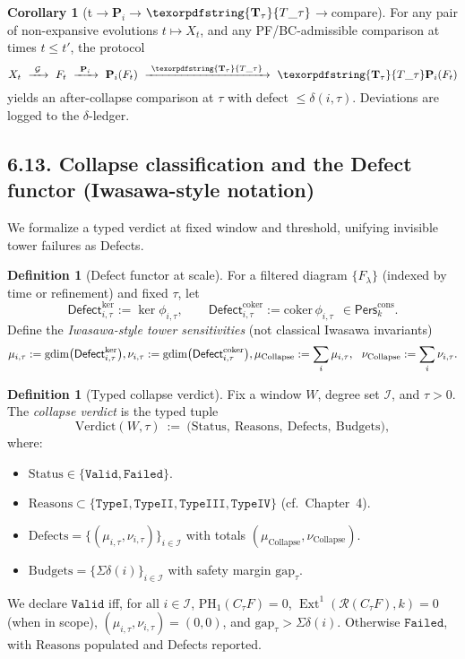 \documentclass[11pt]{article}
\numberwithin{equation}{section}
\theoremstyle{plain}
\theoremstyle{definition}
\theoremstyle{remark}
\DeclareMathOperator{\Ext}{Ext}
\DeclareRobustCommand{\hyp}{\nobreakdash-}
\newcommand{\Pers}{\mathsf{Pers}}
\newcommand{\Rfun}{\mathcal{R}}
\theoremstyle{plain}
\theoremstyle{definition}
\numberwithin{equation}{section}
\newtheorem{corollary}[theorem]{Corollary}
\theoremstyle{definition}
\newtheorem{definition}[theorem]{Definition}
\DeclareRobustCommand{\Perskft}{\Pers^{\mathrm{cons}}_{k}}
\DeclareRobustCommand{\Ttau}{\texorpdfstring{\ensuremath{\mathbf{T}_{\tau}}}{T\_\tau}}
\DeclareRobustCommand{\muc}{\mu_{\mathrm{Collapse}}}
\DeclareRobustCommand{\nuc}{\nu_{\mathrm{Collapse}}}
\numberwithin{equation}{section}
\theoremstyle{plain}
\theoremstyle{definition}
\theoremstyle{remark}
\providecommand{\Tfun}[1]{\mathbf{T}_{#1}}
\providecommand{\Ttau}{\Tfun{\tau}}
\DeclareMathOperator{\coker}{coker} %
\providecommand{\Defect}{\mathsf{Defect}}
\providecommand{\muc}{\mu_{\mathrm{Collapse}}}
\providecommand{\nuc}{\nu_{\mathrm{Collapse}}}
\providecommand{\n}{\unskip\space}
\begin{document}
\begin{corollary}[t\texorpdfstring{$\to$}{->}\(\mathbf{P}_i\)\texorpdfstring{$\to$}{->}\(\Ttau\)\texorpdfstring{$\to$}{->}compare]\label{cor:t-Pi-Ttau-compare}
For any pair of non\hyp expansive evolutions \(t\mapsto X_t\), and any PF/BC\hyp admissible comparison at times \(t\le t'\), the protocol
\[
X_t\ \xrightarrow{\ \mathcal{G}\ }\ F_t\ \xrightarrow{\ \mathbf{P}_i\ }\ \mathbf{P}_i(F_t)\ \xrightarrow{\ \Ttau\ }\ \Ttau\mathbf{P}_i(F_t)
\]
yields an after\hyp collapse comparison at \(\tau\) with defect \(\le \delta(i,\tau)\). Deviations are logged to the \(\delta\)\hyp ledger.
\end{corollary}

\subsection*{6.13. Collapse classification and the Defect functor (Iwasawa\hyp style notation)}
We formalize a typed verdict at fixed window and threshold, unifying invisible tower failures as Defects.

\begin{definition}[Defect functor at scale]\label{def:defect-ch6}
For a filtered diagram \(\{F_\lambda\}\) (indexed by time or refinement) and fixed \(\tau\), let
\[
\Defect_{i,\tau}^{\ker}:=\ker\phi_{i,\tau},\qquad \Defect_{i,\tau}^{\coker}:=\mathrm{coker}\,\phi_{i,\tau}\ \ \in \Perskft.
\]
Define the \emph{Iwasawa\hyp style tower sensitivities} (not classical Iwasawa invariants)
\[
\mu_{i,\tau}:=\mathrm{gdim}\big(\Defect_{i,\tau}^{\ker}\big),\qquad\n\nu_{i,\tau}:=\mathrm{gdim}\big(\Defect_{i,\tau}^{\coker}\big),\qquad\n\muc:=\sum_i\mu_{i,\tau},\ \ \nuc:=\sum_i\nu_{i,\tau}.
\]
\end{definition}

\begin{definition}[Typed collapse verdict]\label{def:typed-verdict}
Fix a window \(W\), degree set \(\mathcal{I}\), and \(\tau>0\). The \emph{collapse verdict} is the typed tuple
\[
\mathrm{Verdict}(W,\tau)\ :=\ \Big(\mathrm{Status},\ \mathrm{Reasons},\ \mathrm{Defects},\ \mathrm{Budgets}\Big),
\]
where:
\begin{itemize}
  \item \(\mathrm{Status}\in\{\texttt{Valid},\texttt{Failed}\}\).
  \item \(\mathrm{Reasons}\subset\{\texttt{TypeI},\texttt{TypeII},\texttt{TypeIII},\texttt{TypeIV}\}\) (cf.\ Chapter~4).
  \item \(\mathrm{Defects}=\{(\mu_{i,\tau},\nu_{i,\tau})\}_{i\in\mathcal{I}}\) with totals \((\muc,\nuc)\).
  \item \(\mathrm{Budgets}=\{\Sigma\delta(i)\}_{i\in\mathcal{I}}\) with safety margin \(\mathrm{gap}_\tau\).
\end{itemize}
We declare \(\texttt{Valid}\) iff, for all \(i\in\mathcal{I}\), \(\mathrm{PH}_1(C_\tau F)=0\), \(\Ext^1(\Rfun(C_\tau F),k)=0\) (when in scope), \((\mu_{i,\tau},\nu_{i,\tau})=(0,0)\), and \(\mathrm{gap}_\tau>\Sigma\delta(i)\).
Otherwise \(\texttt{Failed}\), with \(\mathrm{Reasons}\) populated and Defects reported.
\end{definition}
\end{document}
